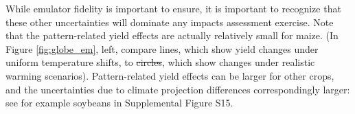 \documentclass[gmdd]{copernicus} %
\providecommand{\DIFadd}[1]{{\protect\color{blue}\uwave{#1}}} %
\providecommand{\DIFdel}[1]{{\protect\color{red}\sout{#1}}}                      %
\providecommand{\DIFaddbegin}{} %
\providecommand{\DIFaddend}{} %
\providecommand{\DIFdelbegin}{} %
\providecommand{\DIFdelend}{} %
\begin{document}
While emulator fidelity is important to ensure, it is important to recognize that these other  uncertainties will dominate any impacts assessment exercise.
Note that the pattern-related yield effects are actually relatively small for maize. (In Figure \ref{fig:globe_em}, left, compare lines, which show yield changes under uniform temperature shifts, to \DIFdelbegin \DIFdel{circles}\DIFdelend \DIFaddbegin \DIFadd{dots}\DIFaddend ,  which show changes under realistic warming scenarios). Pattern-related yield effects can be larger for other crops, and the uncertainties due to climate projection differences correspondingly larger: see for example soybeans in Supplemental Figure S15. 

\DIFdelbegin %

\DIFdelend %
\end{document}
